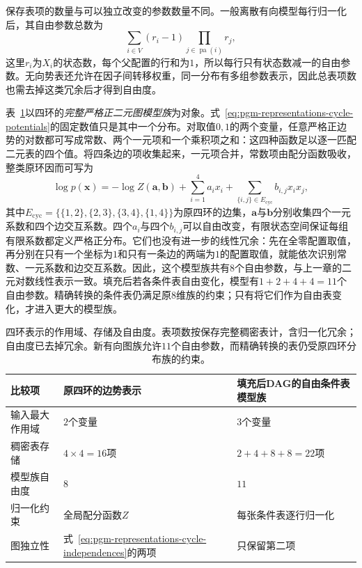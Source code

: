 保存表项的数量与可以独立改变的参数数量不同。一般离散有向模型每行归一化后，其自由参数总数为
\[
  \sum_{i\in V}(r_i-1)
  \prod_{j\in\operatorname{pa}(i)}r_j,
\]
这里$r_i$为$X_i$的状态数，每个父配置的行和为$1$，所以每行只有状态数减一的自由参数。无向势表还允许在因子间转移权重，同一分布有多组参数表示，因此总表项数也需去掉这类冗余后才得到自由度。

表~\ref{tab:pgm-representations-cycle-costs}以四环的\emph{完整严格正二元图模型族}为对象。式~\eqref{eq:pgm-representations-cycle-potentials}的固定数值只是其中一个分布。对取值$0,1$的两个变量，任意严格正边势的对数都可写成常数、两个一元项和一个乘积项之和：这四种函数足以逐一匹配二元表的四个值。将四条边的项收集起来，一元项合并，常数项由配分函数吸收，整类原环因而可写为
\[
  \log p(\bm x)
    =-\log Z(\bm a,\bm b)
      +\sum_{i=1}^{4}a_i x_i
      +\sum_{\{i,j\}\in E_{\mathrm{cyc}}}b_{i,j}x_ix_j,
\]
其中$E_{\mathrm{cyc}}=\{\{1,2\},\{2,3\},\{3,4\},\{1,4\}\}$为原四环的边集，$\bm a$与$\bm b$分别收集四个一元系数和四个边交互系数。四个$a_i$与四个$b_{i,j}$可以自由改变，有限状态空间保证每组有限系数都定义严格正分布。它们也没有进一步的线性冗余：先在全零配置取值，再分别在只有一个坐标为$1$和只有一条边的两端为$1$的配置取值，就能依次识别常数、一元系数和边交互系数。因此，这个模型族共有$8$个自由参数，与上一章的二元对数线性表示一致。填充后若各条件表自由变化，模型有$1+2+4+4=11$个自由参数。精确转换的条件表仍满足原$8$维族的约束；只有将它们作为自由表变化，才进入更大的模型族。

\begin{table}[htbp]
  \centering
  \begin{tabularx}{\linewidth}{@{}lXX@{}}
    \toprule
    比较项 & 原四环的边势表示 & 填充后DAG的自由条件表模型族 \\
    \midrule
    输入最大作用域 & $2$个变量 & $3$个变量 \\
    稠密表存储 & $4\times4=16$项 & $2+4+8+8=22$项 \\
    模型族自由度 & $8$ & $11$ \\
    归一化约束 & 全局配分函数$Z$ & 每张条件表逐行归一化 \\
    图独立性 & 式~\eqref{eq:pgm-representations-cycle-independences}的两项 & 只保留第二项 \\
    \bottomrule
  \end{tabularx}
  \caption{四环表示的作用域、存储及自由度。表项数按保存完整稠密表计，含归一化冗余；自由度已去掉冗余。新有向图族允许$11$个自由参数，而精确转换的表仍受原四环分布族的约束。}
  \label{tab:pgm-representations-cycle-costs}
\end{table}

